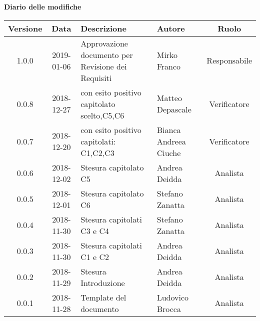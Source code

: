 \begin{center}
		\textbf{Diario delle modifiche}
	\end{center}
	\begin{center}
		\begin{tabularx}{\textwidth}{|c|c|X|X|c|}
			\hline
			\textbf{Versione} & \textbf{Data} & \textbf{Descrizione} & \textbf{Autore} & \textbf{Ruolo} \\
			\hline
			1.0.0 & 2019-01-06 & Approvazione documento per Revisione dei Requisiti & Mirko Franco & Responsabile \\
			\hline
			0.0.8 & 2018-12-27 & \glossario{Verifica} con esito positivo capitolato scelto,C5,C6  & Matteo Depascale & Verificatore \\
			\hline 
			0.0.7 & 2018-12-20 & \glossario{Verifica} con esito positivo  capitolati: C1,C2,C3 & Bianca Andreea Ciuche & Verificatore \\
			\hline
			0.0.6 & 2018-12-02 & Stesura capitolato C5& Andrea Deidda & Analista \\
			\hline
			0.0.5 & 2018-12-01 & Stesura capitolato C6 & Stefano Zanatta & Analista \\
			\hline
			0.0.4 & 2018-11-30 & Stesura capitolati C3 e C4 & Stefano Zanatta & Analista \\
			\hline
			0.0.3 & 2018-11-30 & Stesura capitolati C1 e C2 & Andrea Deidda & Analista \\
			\hline
			0.0.2 & 2018-11-29 & Stesura Introduzione & Andrea Deidda & Analista \\
			\hline
			0.0.1 &  2018-11-28& Template  del documento & Ludovico Brocca & Analista\\
			\hline
		\end{tabularx}
	\end{center}
\newpage